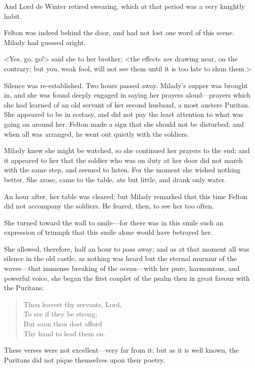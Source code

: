 And Lord de Winter retired swearing, which at that period was a very knightly habit. 

Felton was indeed behind the door, and had not lost one word of this scene. Milady had guessed aright. 

<Yes, go, go!> said she to her brother; <the effects \textit{are} drawing near, on the contrary; but you, weak fool, will not see them until it is too late to shun them.> 

Silence was re-established. Two hours passed away. Milady's supper was brought in, and she was found deeply engaged in saying her prayers aloud---prayers which she had learned of an old servant of her second husband, a most austere Puritan. She appeared to be in ecstasy, and did not pay the least attention to what was going on around her. Felton made a sign that she should not be disturbed; and when all was arranged, he went out quietly with the soldiers. 

Milady knew she might be watched, so she continued her prayers to the end; and it appeared to her that the soldier who was on duty at her door did not march with the same step, and seemed to listen. For the moment she wished nothing better. She arose, came to the table, ate but little, and drank only water. 

An hour after, her table was cleared; but Milady remarked that this time Felton did not accompany the soldiers. He feared, then, to see her too often. 

She turned toward the wall to smile---for there was in this smile such an expression of triumph that this smile alone would have betrayed her. 

She allowed, therefore, half an hour to pass away; and as at that moment all was silence in the old castle, as nothing was heard but the eternal murmur of the waves---that immense breaking of the ocean---with her pure, harmonious, and powerful voice, she began the first couplet of the psalm then in great favour with the Puritans: 
\begin{verse}
Thou leavest thy servants, Lord,\\
To see if they be strong;\\
But soon thou dost afford\\
Thy hand to lead them on.
\end{verse}

These verses were not excellent---very far from it; but as it is well known, the Puritans did not pique themselves upon their poetry. 

